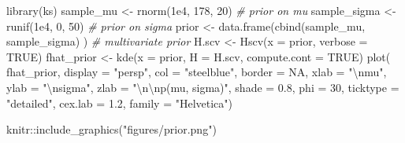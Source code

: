 \documentclass[
  a4paper,11pt,twoside,onecolumn,openright,final,oldfontcommands]{memoir}
\newenvironment{Shaded}{\begin{snugshade}}{\end{snugshade}}
\newcommand{\AttributeTok}[1]{\textcolor[rgb]{0.77,0.63,0.00}{#1}}
\newcommand{\CommentTok}[1]{\textcolor[rgb]{0.56,0.35,0.01}{\textit{#1}}}
\newcommand{\ConstantTok}[1]{\textcolor[rgb]{0.00,0.00,0.00}{#1}}
\newcommand{\DecValTok}[1]{\textcolor[rgb]{0.00,0.00,0.81}{#1}}
\newcommand{\FloatTok}[1]{\textcolor[rgb]{0.00,0.00,0.81}{#1}}
\newcommand{\FunctionTok}[1]{\textcolor[rgb]{0.00,0.00,0.00}{#1}}
\newcommand{\NormalTok}[1]{#1}
\newcommand{\OtherTok}[1]{\textcolor[rgb]{0.56,0.35,0.01}{#1}}
\newcommand{\SpecialCharTok}[1]{\textcolor[rgb]{0.00,0.00,0.00}{#1}}
\newcommand{\StringTok}[1]{\textcolor[rgb]{0.31,0.60,0.02}{#1}}
\theoremstyle{definition}
\theoremstyle{definition}
\theoremstyle{definition}
\theoremstyle{definition}
\theoremstyle{remark}
\begin{document}
\begin{Shaded}
\begin{Highlighting}[]
\FunctionTok{library}\NormalTok{(ks)}
\NormalTok{sample\_mu }\OtherTok{\textless{}{-}} \FunctionTok{rnorm}\NormalTok{(}\FloatTok{1e4}\NormalTok{, }\DecValTok{178}\NormalTok{, }\DecValTok{20}\NormalTok{) }\CommentTok{\# prior on mu}
\NormalTok{sample\_sigma }\OtherTok{\textless{}{-}} \FunctionTok{runif}\NormalTok{(}\FloatTok{1e4}\NormalTok{, }\DecValTok{0}\NormalTok{, }\DecValTok{50}\NormalTok{) }\CommentTok{\# prior on sigma}
\NormalTok{prior }\OtherTok{\textless{}{-}} \FunctionTok{data.frame}\NormalTok{(}\FunctionTok{cbind}\NormalTok{(sample\_mu, sample\_sigma) ) }\CommentTok{\# multivariate prior}
\NormalTok{H.scv }\OtherTok{\textless{}{-}} \FunctionTok{Hscv}\NormalTok{(}\AttributeTok{x =}\NormalTok{ prior, }\AttributeTok{verbose =} \ConstantTok{TRUE}\NormalTok{)}
\NormalTok{fhat\_prior }\OtherTok{\textless{}{-}} \FunctionTok{kde}\NormalTok{(}\AttributeTok{x =}\NormalTok{ prior, }\AttributeTok{H =}\NormalTok{ H.scv, }\AttributeTok{compute.cont =} \ConstantTok{TRUE}\NormalTok{)}
\FunctionTok{plot}\NormalTok{(}
\NormalTok{    fhat\_prior, }\AttributeTok{display =} \StringTok{"persp"}\NormalTok{, }\AttributeTok{col =} \StringTok{"steelblue"}\NormalTok{, }\AttributeTok{border =} \ConstantTok{NA}\NormalTok{,}
    \AttributeTok{xlab =} \StringTok{"}\SpecialCharTok{\textbackslash{}n}\StringTok{mu"}\NormalTok{, }\AttributeTok{ylab =} \StringTok{"}\SpecialCharTok{\textbackslash{}n}\StringTok{sigma"}\NormalTok{, }\AttributeTok{zlab =} \StringTok{"}\SpecialCharTok{\textbackslash{}n\textbackslash{}n}\StringTok{p(mu, sigma)"}\NormalTok{,}
    \AttributeTok{shade =} \FloatTok{0.8}\NormalTok{, }\AttributeTok{phi =} \DecValTok{30}\NormalTok{, }\AttributeTok{ticktype =} \StringTok{"detailed"}\NormalTok{,}
    \AttributeTok{cex.lab =} \FloatTok{1.2}\NormalTok{, }\AttributeTok{family =} \StringTok{"Helvetica"}\NormalTok{)}
\end{Highlighting}
\end{Shaded}

\begin{Shaded}
\begin{Highlighting}[]
\NormalTok{knitr}\SpecialCharTok{::}\FunctionTok{include\_graphics}\NormalTok{(}\StringTok{"figures/prior.png"}\NormalTok{)}
\end{Highlighting}
\end{Shaded}
\end{document}
